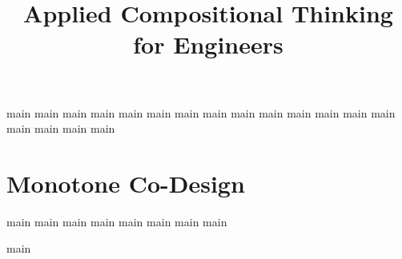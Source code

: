 

\pagestyle{scrheadings}%

 \ohead{\pagemark}
 \ihead{\headmark}
 \cfoot{}
\dominitoc
\doparttoc
\setcounter{parttocdepth}{0}
\setcounter{minitocdepth}{1}

\title{Applied Compositional Thinking\\ for Engineers}
\date{}



\setcounter{tocdepth}{1}
\tableofcontents


{main}
{main}
{main}
{main}
{main}
{main}
{main}
{main}
{main}
{main}
{main}
{main}
{main}
{main}
{main}
{main}
{main}
{main}



\part{Monotone Co-Design}\label{part:co-design}

{main}
{main}
{main}
{main}
{main}
{main}
{main}
{main}




{main}



